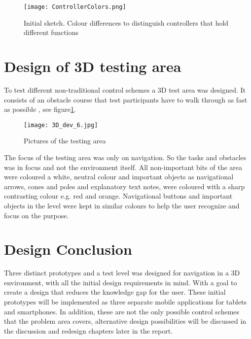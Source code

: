 \begin{figure}[H]
\centering
\texttt{[image: ControllerColors.png]}
\caption{Initial sketch. Colour differences to distinguish controllers that hold different functions}
\end{figure}

\section{Design of 3D testing area}\label{DesignTestArea}
To test different non-traditional control schemes a 3D test area was designed. It consists of an obstacle course that test participants have to walk through as fast as possible , see figure\ref{TestLevels}.

\begin{figure}[H]
\centering
\texttt{[image: 3D\_dev\_6.jpg]}
\caption{Pictures of the testing area}
\label{TestLevels}
\end{figure}

The focus of the testing area was only on navigation. So the tasks and obstacles was in focus and not the environment itself. All non-important bits of the area were coloured a white, neutral colour and important objects as navigational arrows, cones and poles and explanatory text notes, were coloured with a sharp contrasting colour e.g. red and orange. Navigational buttons and important objects in the level were kept in similar colours to help the user recognize and focus on the purpose. 
\section{Design Conclusion}
Three distinct prototypes and a test level was designed for navigation in a 3D environment, with all the initial design requirements in mind. With a goal to create a design that reduces the knowledge gap for the user. These initial prototypes will be implemented as three separate mobile applications for tablets and smartphones. 
In addition, these are not the only possible control schemes that the problem area covers, alternative design possibilities will be discussed in the discussion and redesign chapters later in the report. 